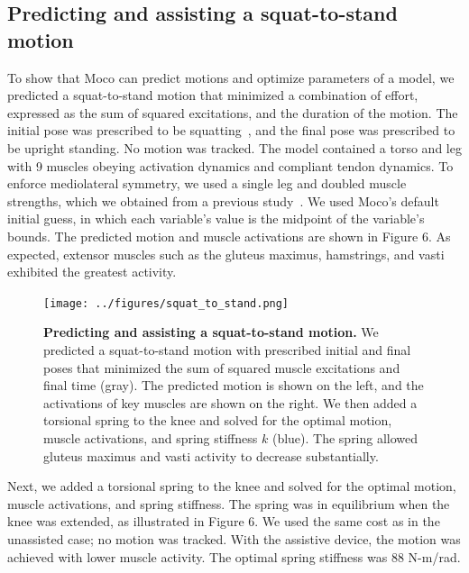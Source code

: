 \documentclass[10pt,letterpaper]{article}
\begin{document}
\subsection*{Predicting and assisting a squat-to-stand motion}

To show that Moco can predict motions and optimize parameters of a model, we predicted a squat-to-stand motion that minimized a combination of effort, expressed as the sum of squared excitations, and the duration of the motion. The initial pose was prescribed to be squatting~\cite{Fregly:2015}, and the final pose was prescribed to be upright standing. No motion was tracked. The model contained a torso and leg with 9 muscles obeying activation dynamics and compliant tendon dynamics. To enforce mediolateral symmetry, we used a single leg and doubled muscle strengths, which we obtained from a previous study~\cite{Ong:2019a}. We used Moco's default initial guess, in which each variable's value is the midpoint of the variable's bounds. The predicted motion and muscle activations are shown in Figure 6. As expected, extensor muscles such as the gluteus maximus, hamstrings, and vasti exhibited the greatest activity.

\begin{figure}[!h]
    \begin{adjustwidth}{-1.125in}{-1.125in} %
        \centering
        \texttt{[image: ../figures/squat\_to\_stand.png]}
        \caption{{\bf Predicting and assisting a squat-to-stand motion.}
We predicted a squat-to-stand motion with prescribed initial and final poses that minimized the sum of squared muscle excitations and final time (gray). The predicted motion is shown on the left, and the activations of key muscles are shown on the right. We then added a torsional spring to the knee and solved for the optimal motion, muscle activations, and spring stiffness $k$ (blue). The spring allowed gluteus maximus and vasti activity to decrease substantially.
        }
        \label{squattotstand}
    \end{adjustwidth}
\end{figure}

Next, we added a torsional spring to the knee and solved for the optimal motion, muscle activations, and spring stiffness. The spring was in equilibrium when the knee was extended, as illustrated in Figure 6. We used the same cost as in the unassisted case; no motion was tracked. With the assistive device, the motion was achieved with lower muscle activity. The optimal spring stiffness was 88 N-m/rad.
\end{document}
